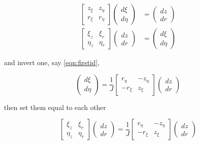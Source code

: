 \begin{align}
    \label{eqn:firstid}
    \begin{bmatrix}
        z_\xi & z_\eta \\
        r_\xi & r_\eta
    \end{bmatrix}
    \begin{pmatrix}
        d\xi \\
        d\eta
    \end{pmatrix}
    &=
    \begin{pmatrix}
        dz\\
        dr
    \end{pmatrix} \\
    \begin{bmatrix}
        \xi_z & \xi_r \\
        \eta_z & \eta_r
    \end{bmatrix}
    \begin{pmatrix}
        dz \\
        dr
    \end{pmatrix}
    &=
    \begin{pmatrix}
        d\xi \\
        d\eta
    \end{pmatrix}
\end{align}

\noindent and invert one, say \cref{eqn:firstid},

\begin{equation}
    \begin{pmatrix}
        d\xi \\
        d\eta
    \end{pmatrix}
    =
    \frac{1}{J}\begin{bmatrix}
        r_\eta & -z_\eta \\
        -r_\xi & z_\xi
    \end{bmatrix}
    \begin{pmatrix}
        dz\\
        dr
    \end{pmatrix}
\end{equation}

\noindent then set them equal to each other

\begin{equation}
    \begin{bmatrix}
        \xi_z & \xi_r \\
        \eta_z & \eta_r
    \end{bmatrix}
    \begin{pmatrix}
        dz \\
        dr
    \end{pmatrix}
    =
    \frac{1}{J}\begin{bmatrix}
        r_\eta & -z_\eta \\
        -r_\xi & z_\xi
    \end{bmatrix}
    \begin{pmatrix}
        dz\\
        dr
    \end{pmatrix}
\end{equation}

